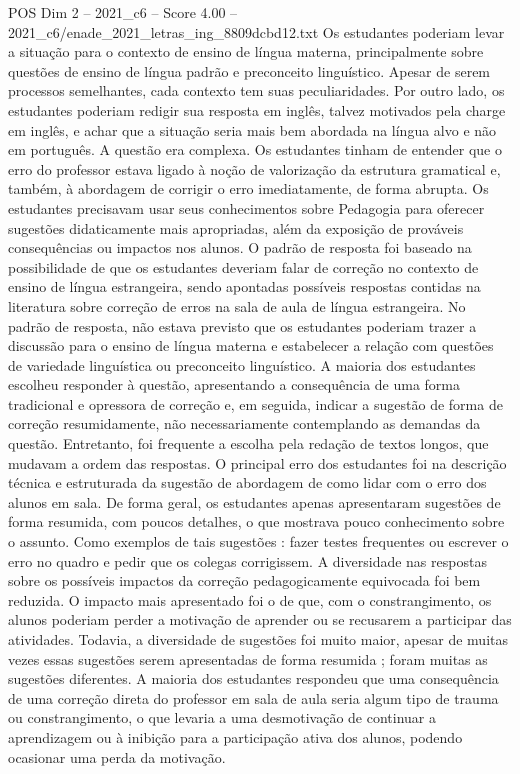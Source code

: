 \begin{textsample}{POS Dim 2 – 2021\_c6 – Score 4.00 – 2021\_c6/enade\_2021\_letras\_ing\_8809dcbd12.txt}
Os estudantes poderiam levar a situação para o contexto de ensino de língua materna, principalmente sobre questões de ensino de língua padrão e preconceito linguístico.
Apesar de serem processos semelhantes, cada contexto tem suas peculiaridades.
Por outro lado, os estudantes poderiam redigir sua resposta em inglês, talvez motivados pela charge em inglês, e achar que a situação seria mais bem abordada na língua alvo e não em português.
A questão era complexa.
Os estudantes tinham de entender que o erro do professor estava ligado à noção de valorização da estrutura gramatical e, também, à abordagem de corrigir o erro imediatamente, de forma abrupta.
Os estudantes precisavam usar seus conhecimentos sobre Pedagogia para oferecer sugestões didaticamente mais apropriadas, além da exposição de prováveis consequências ou impactos nos alunos.
O padrão de resposta foi baseado na possibilidade de que os estudantes deveriam falar de correção no contexto de ensino de língua estrangeira, sendo apontadas possíveis respostas contidas na literatura sobre correção de erros na sala de aula de língua estrangeira.
No padrão de resposta, não estava previsto que os estudantes poderiam trazer a discussão para o ensino de língua materna e estabelecer a relação com questões de variedade linguística ou preconceito linguístico.
A maioria dos estudantes escolheu responder à questão, apresentando a consequência de uma forma tradicional e opressora de correção e, em seguida, indicar a sugestão de forma de correção resumidamente, não necessariamente contemplando as demandas da questão.
Entretanto, foi frequente a escolha pela redação de textos longos, que mudavam a ordem das respostas.
O principal erro dos estudantes foi na descrição técnica e estruturada da sugestão de abordagem de como lidar com o erro dos alunos em sala.
De forma geral, os estudantes apenas apresentaram sugestões de forma resumida, com poucos detalhes, o que mostrava pouco conhecimento sobre o assunto.
Como exemplos de tais sugestões : fazer testes frequentes ou escrever o erro no quadro e pedir que os colegas corrigissem.
A diversidade nas respostas sobre os possíveis impactos da correção pedagogicamente equivocada foi bem reduzida.
O impacto mais apresentado foi o de que, com o constrangimento, os alunos poderiam perder a motivação de aprender ou se recusarem a participar das atividades.
Todavia, a diversidade de sugestões foi muito maior, apesar de muitas vezes essas sugestões serem apresentadas de forma resumida ; foram muitas as sugestões diferentes.
A maioria dos estudantes respondeu que uma consequência de uma correção direta do professor em sala de aula seria algum tipo de trauma ou constrangimento, o que levaria a uma desmotivação de continuar a aprendizagem ou à inibição para a participação ativa dos alunos, podendo ocasionar uma perda da motivação.

\end{textsample}
